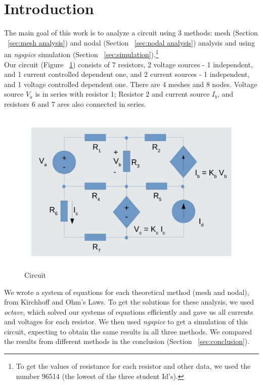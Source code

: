 \section{Introduction}
\label{sec:introduction}
The main goal of this work is to analyze a circuit using 3 methods: mesh
(Section ~\ref{sec:mesh analysis}) and nodal (Section ~\ref{sec:nodal analysis}) analysis and using an \textit{ngspice} simulation (Section ~\ref{sec:simulation}).\footnote{To get the values of resistance for each resistor and other data, we used the number 96514 (the lowest of the three student Id's).}\\

Our circuit (Figure ~\ref{fig:circuit}) consists of 7 resistors, 2 voltage sources - 1 independent, and 1 current controlled dependent one, and 2 current sources - 1 independent, and 1 voltage controlled dependent one. There are 4 meshes and 8 nodes. Voltage source $V_a$ is in series with resistor 1; Resistor 2 and current source $I_b$, and resistors 6 and 7 ares also connected in series. \\
\begin{figure}[H] \centering
\includegraphics[width=0.8\linewidth]{circuit.pdf}
\caption{Circuit}
\label{fig:circuit}
\end{figure} 
We wrote a system of equations for each theoretical method (mesh and nodal), from Kirchhoff and Ohm's Laws. To get the solutions for these analysis, we used \textit{octave}, which solved our systems of equations efficiently and gave us all currents and voltages for each resistor. We then used \textit{ngspice} to get a simulation of this circuit, expecting to obtain the same results in all three methods. We compared the results from different methods in the conclusion (Section ~\ref{sec:conclusion}).\\
